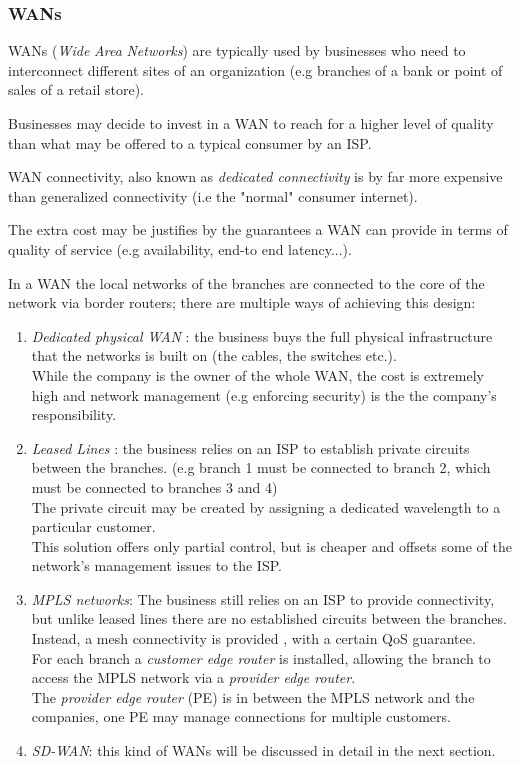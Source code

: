 \documentclass{article}
\begin{document}
  \subsubsection{WANs}
  WANs (\textit{Wide} \textit{Area} \textit{Networks}) are typically used by businesses who need to interconnect different sites of an organization (e.g branches of a bank or point of sales of a retail store).

  Businesses may decide to invest in a WAN to reach for a higher level of quality than what may be offered to a typical consumer by an ISP.
   
  WAN connectivity, also known as \textit{dedicated connectivity} is by far more expensive than generalized connectivity (i.e the "normal" consumer internet).
  
   The extra cost may be justifies by the guarantees a WAN can provide in terms of quality of service (e.g availability, end-to end latency...).
   
   In a WAN the local networks of the branches are connected to the core of the network via border routers; there are multiple ways of achieving this design:
   
   \begin{enumerate}
   	\item \textit{Dedicated physical WAN} : the business buys the full physical infrastructure that the networks is built on (the cables, the switches etc.). \\ While the company is the owner of the whole WAN, the cost is extremely high and network management (e.g enforcing security) is the the company's responsibility.
   	
   	\item \textit{Leased Lines} : the business relies on an ISP to establish private circuits between the branches. (e.g branch 1 must be connected to branch 2, which must be connected to branches 3 and 4) \\
   	The private circuit may be created by assigning  a dedicated wavelength to a particular customer. \\
   	This solution offers only partial control, but is cheaper and offsets some of the network's management issues to the ISP.
   	
   	\item \textit{MPLS networks}: The business still relies on an ISP to provide connectivity, but unlike leased lines there are no established circuits between the branches.  Instead, a mesh connectivity is provided , with a certain QoS guarantee. \\
   	For each branch a \textit{customer edge router} is installed, allowing the branch to access the MPLS network via a \textit{provider edge router}. \\
   	The \textit{provider edge router} (PE) is in between the MPLS network and the companies, one PE may manage connections for multiple customers.
   	
   	\item \textit{SD-WAN}: this kind of WANs will be discussed in detail in the next section.
   	
   \end{enumerate} 
\end{document}
